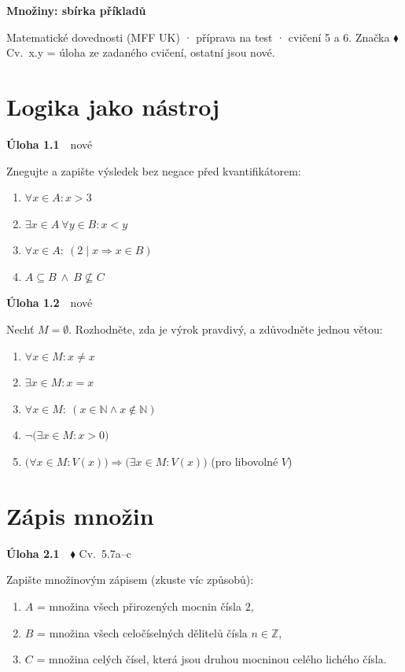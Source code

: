 \documentclass[11pt,a4paper]{article}
\newcommand{\N}{\mathbb N}\newcommand{\Z}{\mathbb Z}\newcommand{\Pot}{\mathcal P}
\newcommand{\pr}{\mathrel{\mid}}\newcommand{\nepr}{\mathrel{\nmid}}\newcommand{\sm}{\setminus}
\newenvironment{pol}{\begin{enumerate}[label=(\alph*),leftmargin=2em,itemsep=3pt]}{\end{enumerate}}
\newenvironment{uloha}[2]{\Needspace{6\baselineskip}\par\vspace{6pt}\noindent\textbf{Úloha #1}\ \ {\footnotesize\color{gray}#2}\par\vspace{2pt}}{\par\vspace{4pt}}
\begin{document}
{\Large\bfseries Množiny: sbírka příkladů}\par
{\color{gray}Matematické dovednosti (MFF UK) · příprava na test · cvičení 5 a 6. Značka $\blacklozenge$ Cv.\ x.y = úloha ze zadaného cvičení, ostatní jsou nové.}\par
\section{Logika jako nástroj}

\begin{uloha}{1.1}{nové}
Znegujte a zapište výsledek bez negace před kvantifikátorem:
\begin{pol}
  \item $\forall x\in A: x>3$
  \item $\exists x\in A\ \forall y\in B: x<y$
  \item $\forall x\in A:\ (2\pr x\Rightarrow x\in B)$
  \item $A\subseteq B\ \land\ B\nsubseteq C$
\end{pol}

\end{uloha}

\begin{uloha}{1.2}{nové}
Nechť $M=\emptyset$. Rozhodněte, zda je výrok pravdivý, a zdůvodněte jednou větou:
\begin{pol}
  \item $\forall x\in M: x\neq x$
  \item $\exists x\in M: x=x$
  \item $\forall x\in M:\ (x\in\N\land x\notin\N)$
  \item $\neg\big(\exists x\in M: x>0\big)$
  \item $\big(\forall x\in M: V(x)\big)\Rightarrow\big(\exists x\in M: V(x)\big)$ (pro libovolné $V$)
\end{pol}

\end{uloha}

\section{Zápis množin}

\begin{uloha}{2.1}{$\blacklozenge$ Cv.~5.7a--c}
Zapište množinovým zápisem (zkuste víc způsobů):
\begin{pol}
  \item $A$ = množina všech přirozených mocnin čísla $2$,
  \item $B$ = množina všech celočíselných dělitelů čísla $n\in\Z$,
  \item $C$ = množina celých čísel, která jsou druhou mocninou celého lichého čísla.
\end{pol}

\end{uloha}
\end{document}
